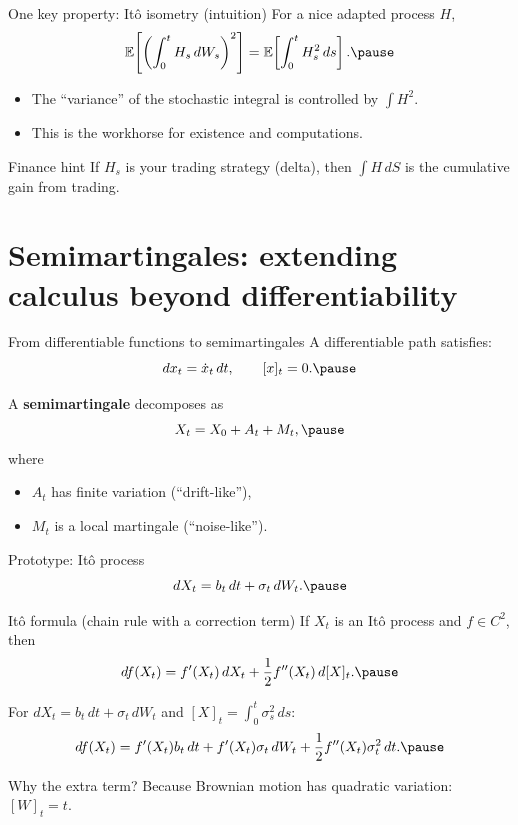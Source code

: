 \documentclass[10pt,aspectratio=169]{beamer}
\begin{document}
\begin{frame}{One key property: It\^o isometry (intuition)}
For a nice adapted process $H$,
\[
\mathbb{E}\!\left[\left(\int_0^t H_s\,dW_s\right)^2\right]
=
\mathbb{E}\!\left[\int_0^t H_s^2\,ds\right].\pause
\]

\begin{itemize}
  \item The ``variance'' of the stochastic integral is controlled by $\int H^2$.\pause
  \item This is the workhorse for existence and computations.\pause
\end{itemize}

\begin{exampleblock}{Finance hint}
If $H_s$ is your trading strategy (delta), then $\int H\,dS$ is the cumulative gain from trading.
\end{exampleblock}
\end{frame}

\section{Semimartingales: extending calculus beyond differentiability}

\begin{frame}{From differentiable functions to semimartingales}
A differentiable path satisfies:
\[
dx_t = \dot x_t\,dt,
\qquad [x]_t=0.\pause
\]

\medskip
A \textbf{semimartingale} decomposes as
\[
X_t = X_0 + A_t + M_t,\pause
\]
where
\begin{itemize}
  \item $A_t$ has finite variation (``drift-like''),
  \item $M_t$ is a local martingale (``noise-like'').
\end{itemize}

\begin{exampleblock}{Prototype: It\^o process}
\[
dX_t = b_t\,dt + \sigma_t\,dW_t.\pause
\]
\end{exampleblock}
\end{frame}

\begin{frame}{It\^o formula (chain rule with a correction term)}
If $X_t$ is an It\^o process and $f\in C^2$, then
\[
df(X_t)
=
f'(X_t)\,dX_t
+\frac12 f''(X_t)\,d[X]_t.\pause
\]

For $dX_t=b_t\,dt+\sigma_t\,dW_t$ and $[X]_t=\int_0^t \sigma_s^2\,ds$:
\[
df(X_t)=f'(X_t)b_t\,dt + f'(X_t)\sigma_t\,dW_t + \frac12 f''(X_t)\sigma_t^2\,dt.\pause
\]

\begin{exampleblock}{Why the extra term?}
Because Brownian motion has quadratic variation: $[W]_t=t$.
\end{exampleblock}
\end{frame}
\end{document}
